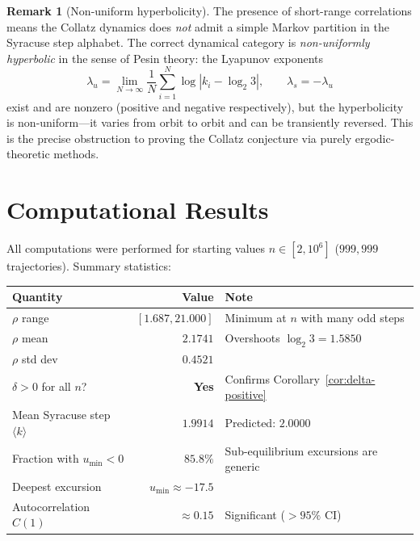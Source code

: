 \documentclass[11pt,a4paper]{article}
\theoremstyle{plain}
\theoremstyle{definition}
\newtheorem{remark}[theorem]{Remark}
\begin{document}
\begin{remark}[Non-uniform hyperbolicity]
    The presence of short-range correlations means the Collatz dynamics does \emph{not} admit a simple Markov partition in the Syracuse step alphabet. The correct dynamical category is \emph{non-uniformly hyperbolic} in the sense of Pesin theory: the Lyapunov exponents
    \begin{equation}
        \lambda_u = \lim_{N \to \infty} \frac{1}{N} \sum_{i=1}^{N} \log|k_i - \log_2 3|, \qquad \lambda_s = -\lambda_u
    \end{equation}
    exist and are nonzero (positive and negative respectively), but the hyperbolicity is non-uniform---it varies from orbit to orbit and can be transiently reversed. This is the precise obstruction to proving the Collatz conjecture via purely ergodic-theoretic methods.
\end{remark}


\section{Computational Results}\label{sec:computation}

All computations were performed for starting values $n \in [2, 10^6]$ ($999{,}999$ trajectories). Summary statistics:

\begin{center}
    \renewcommand{\arraystretch}{1.3}
    \begin{tabular}{lrl}
        \toprule
        \textbf{Quantity} & \textbf{Value} & \textbf{Note} \\
        \midrule
        $\rho$ range & $[1.687, 21.000]$ & Minimum at $n$ with many odd steps \\
        $\rho$ mean & $2.1741$ & Overshoots $\log_2 3 = 1.5850$ \\
        $\rho$ std dev & $0.4521$ & \\
        $\delta > 0$ for all $n$? & \textbf{Yes} & Confirms Corollary~\ref{cor:delta-positive} \\
        Mean Syracuse step $\langle k \rangle$ & $1.9914$ & Predicted: $2.0000$ \\
        Fraction with $u_{\min} < 0$ & $85.8\%$ & Sub-equilibrium excursions are generic \\
        Deepest excursion & $u_{\min} \approx -17.5$ & \\
        Autocorrelation $C(1)$ & $\approx 0.15$ & Significant ($> 95\%$ CI) \\
        \bottomrule
    \end{tabular}
\end{center}
\end{document}
